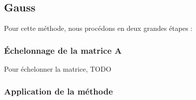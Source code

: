 \documentclass[letter]{article}
\begin{document}
\subsection{Gauss}
\label{sec:orgcec4756}

Pour cette méthode, nous procédons en deux grandes étapes :

\subsubsection{Échelonnage de la matrice A}
\label{sec:org6a16cd4}

Pour échelonner la matrice, TODO

\subsubsection{Application de la méthode}
\label{sec:org228b930}
\end{document}
